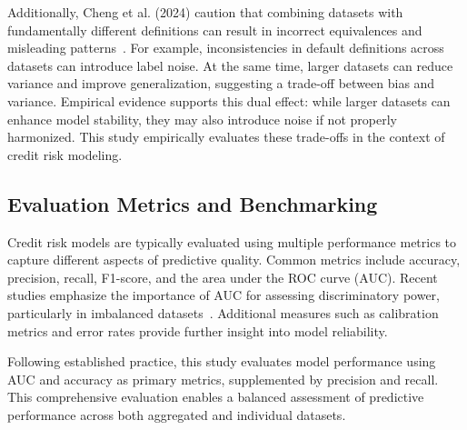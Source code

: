 \documentclass[onecolumn]{IEEEtai}
\begin{document}
Additionally, Cheng et al. (2024) caution that combining datasets with fundamentally different definitions can result in incorrect equivalences and misleading patterns~\cite{8}. For example, inconsistencies in default definitions across datasets can introduce label noise. At the same time, larger datasets can reduce variance and improve generalization, suggesting a trade-off between bias and variance. Empirical evidence supports this dual effect: while larger datasets can enhance model stability, they may also introduce noise if not properly harmonized. This study empirically evaluates these trade-offs in the context of credit risk modeling.

\subsection{Evaluation Metrics and Benchmarking}

Credit risk models are typically evaluated using multiple performance metrics to capture different aspects of predictive quality. Common metrics include accuracy, precision, recall, F1-score, and the area under the ROC curve (AUC). Recent studies emphasize the importance of AUC for assessing discriminatory power, particularly in imbalanced datasets~\cite{1,2,17,18,21}. Additional measures such as calibration metrics and error rates provide further insight into model reliability.

Following established practice, this study evaluates model performance using AUC and accuracy as primary metrics, supplemented by precision and recall. This comprehensive evaluation enables a balanced assessment of predictive performance across both aggregated and individual datasets.
\end{document}
